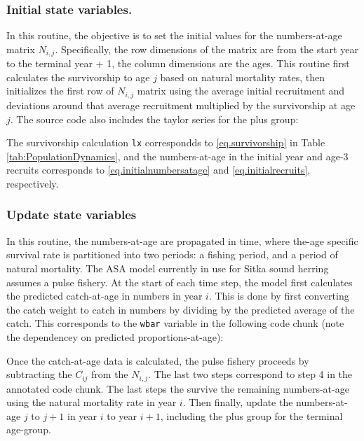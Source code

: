 \documentclass[12pt,letterpaper]{article}
\begin{document}
  \subsubsection{Initial state variables.} %
    \label{ssub:initial_state_variables_}
    
    In this routine, the objective is to set the initial values for the numbers-at-age matrix $N_{i,j}$.  Specifically, the row dimensions of the matrix are from the start year to the terminal year + 1, the column dimensions are the ages.  This routine first calculates the survivorship to age $j$ based on natural mortality rates, then initializes the first row of $N_{i,j}$ matrix using the average initial recruitment and deviations around that average recruitment multiplied by the survivorship at age $j$.  The source code also includes the taylor series for the plus group:
    

    The survivorship calculation \texttt{lx} correspondds to \eqref{eq.survivorship} in Table \ref{tab:PopulationDynamics}, and the numbers-at-age in the initial year and age-3 recruits corresponds to \eqref{eq.initialnumbersatage} and \eqref{eq.initialrecruits}, respectively.

    \subsubsection{Update state variables} %
    \label{ssub:update_state_variables}
    In this routine, the numbers-at-age are propagated in time, where the-age specific survival rate is partitioned into two periods: a fishing period, and a period of natural mortality.  The ASA model currently in use for Sitka sound herring assumes a pulse fishery.  At the start of each time step, the model first calculates the predicted catch-at-age in numbers in year $i$. This is done by first converting the catch weight to catch in numbers by dividing by the predicted average of the catch.  This corresponds to the \texttt{wbar} variable in the following code chunk (note the dependencey on predicted proportions-at-age):
    
    Once the catch-at-age data is calculated, the pulse fishery proceeds by subtracting the $C_{ij}$  from the $N_{i,j}$.  The last two steps correspond to step 4 in the annotated code chunk. The last steps the survive the remaining numbers-at-age using the natural mortality rate in year $i$. Then finally, update the numbers-at-age $j$ to $j+1$ in year $i$ to year $i+1$, including the plus group for the terminal age-group.
\end{document}

